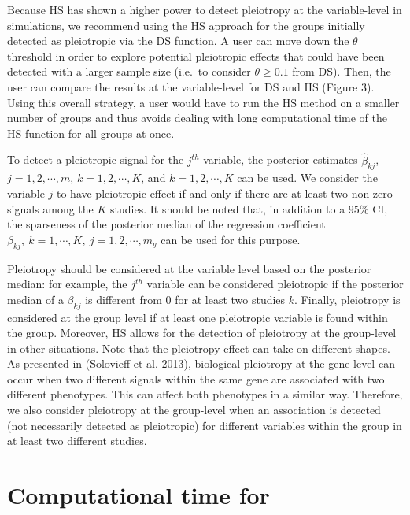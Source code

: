Because HS has shown a higher power to detect pleiotropy at the variable-level in simulations, we recommend using the HS approach for the groups initially detected as pleiotropic via the DS function.
A user can move down the \(\theta\) threshold in order to explore potential pleiotropic effects that could have been detected with a larger sample size (i.e.~to consider \(\theta \geq 0.1\) from DS).
Then, the user can compare the results at the variable-level for DS and HS (Figure 3).
Using this overall strategy, a user would have to run the HS method on a smaller number of groups and thus avoids dealing with long computational time of the HS function for all groups at once.

To detect a pleiotropic signal for the \(j^{th}\) variable, the posterior estimates \(\hat{\beta}_{kj}\), \(j=1,2,\cdots,m\), \(k=1,2,\cdots,K\), and \(k=1,2,\cdots,K\) can be used.
We consider the variable \(j\) to have pleiotropic effect if and only if there are at least two non-zero signals among the \(K\) studies.
It should be noted that, in addition to a \(95\%\) CI, the sparseness of the posterior median of the regression coefficient \(\beta_{kj}, ~k=1,\cdots,K,~j=1,2,\cdots,m_g\) can be used for this purpose.

Pleiotropy should be considered at the variable level based on the posterior median: for example, the \(j^{th}\) variable can be considered pleiotropic if the posterior median of a \(\beta_{kj}\) is different from 0 for at least two studies \(k\).
Finally, pleiotropy is considered at the group level if at least one pleiotropic variable is found within the group. Moreover, HS allows for the detection of pleiotropy at the group-level in other situations. Note that the pleiotropy effect can take on different shapes.
As presented in (Solovieff et al. 2013), biological pleiotropy at the gene level can occur when two different signals within the same gene are associated with two different phenotypes.
This can affect both phenotypes in a similar way.
Therefore, we also consider pleiotropy at the group-level when an association is detected (not necessarily detected as pleiotropic) for different variables within the group in at least two different studies.

\hypertarget{computational-time-for}{%
\section{\texorpdfstring{Computational time for }{Computational time for }}\label{computational-time-for}}

